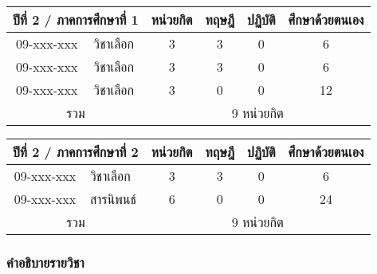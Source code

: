 \vspace{5ex}\par\noindent
\begin{tabular}{|cp{}|cccc|}
\hline
\multicolumn{2}{|c|}{ปีที่ 2 / ภาคการศึกษาที่ 1} & \multicolumn{1}{c|}{หน่วยกิต} & \multicolumn{1}{c|}{ทฤษฎี} & \multicolumn{1}{c|}{ปฏิบัติ} & ศึกษาด้วยตนเอง \\ \hline
\multicolumn{1}{|c|}{09-xxx-xxx}  & วิชาเลือก  & \multicolumn{1}{c|}{3}        & \multicolumn{1}{c|}{3}     & \multicolumn{1}{c|}{0}       & 6             \\ \hline
\multicolumn{1}{|c|}{09-xxx-xxx}  & วิชาเลือก  & \multicolumn{1}{c|}{3}        & \multicolumn{1}{c|}{3}     & \multicolumn{1}{c|}{0}       & 6             \\ \hline
\multicolumn{1}{|c|}{09-xxx-xxx}  & วิชาเลือก & \multicolumn{1}{c|}{3}        & \multicolumn{1}{c|}{0}     & \multicolumn{1}{c|}{0}       & 12             \\ \hline
\multicolumn{2}{|c|}{รวม}                        & \multicolumn{4}{c|}{9 หน่วยกิต}                                                                            \\ \hline
\end{tabular}

\vspace{5ex}\par\noindent
\begin{tabular}{|cp{}|cccc|}
\hline
\multicolumn{2}{|c|}{ปีที่ 2 / ภาคการศึกษาที่ 2} & \multicolumn{1}{c|}{หน่วยกิต} & \multicolumn{1}{c|}{ทฤษฎี} & \multicolumn{1}{c|}{ปฏิบัติ} & ศึกษาด้วยตนเอง \\ \hline
\multicolumn{1}{|c|}{09-xxx-xxx}  & วิชาเลือก  & \multicolumn{1}{c|}{3}        & \multicolumn{1}{c|}{3}     & \multicolumn{1}{c|}{0}       & 6             \\ \hline
\multicolumn{1}{|c|}{09-xxx-xxx}  & สารนิพนธ์ & \multicolumn{1}{c|}{6}        & \multicolumn{1}{c|}{0}     & \multicolumn{1}{c|}{0}       & 24             \\ \hline
\multicolumn{2}{|c|}{รวม}                        & \multicolumn{4}{c|}{9 หน่วยกิต}                                                                            \\ \hline
\end{tabular}


\clearpage
\subsubsection{คำอธิบายรายวิชา}


































